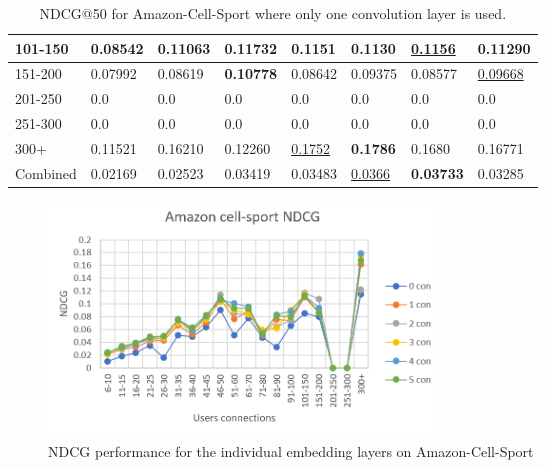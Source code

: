 \begin{table}[]
\begin{tabular}{|l|l|l|l|l|l|l||l|}
        101-150     & 0.08542                        & 0.11063                        & \textbf{0.11732}               & 0.1151                         & 0.1130                         & \underline{0.1156}              & 0.11290                    \\ \hline
        151-200     & 0.07992                        & 0.08619                        & \textbf{0.10778}               & 0.08642                        & 0.09375                        & 0.08577                         & \underline{0.09668}        \\ \hline
        201-250     & 0.0                            & 0.0                            & 0.0                            & 0.0                            & 0.0                            & 0.0                             & 0.0                        \\ \hline
        251-300     & 0.0                            & 0.0                            & 0.0                            & 0.0                            & 0.0                            & 0.0                             & 0.0                        \\ \hline
        300+        & 0.11521                        & 0.16210                        & 0.12260                        & \underline{0.1752}             & \textbf{0.1786}                & 0.1680                          & 0.16771                    \\ \hline
        Combined    & 0.02169                        & 0.02523                        & 0.03419                        & 0.03483                        & \underline{0.0366}             & \textbf{0.03733}                & 0.03285                    \\ \hline
    \end{tabular}
    \caption{NDCG@50 for Amazon-Cell-Sport where only one convolution layer is used.}
    \label{tab:Amazon-Cell-Sport-ndcg-evaluation}
\end{table}
\begin{figure}[]
    \includegraphics[width=0.5\textwidth]{figures/evaluation/amazon-cell-sport-ndcg.png}
    \centering
    \caption{NDCG performance for the individual embedding layers on Amazon-Cell-Sport}
    \label{fig:amazon-cell-sport-individual-evaluation-ndcg}
\end{figure}

